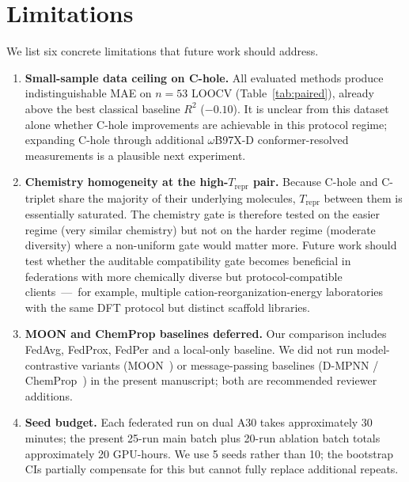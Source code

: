 \documentclass[11pt,a4paper]{article}
\begin{document}
\section{Limitations}\label{sec:limitations}

We list six concrete limitations that future work should address.

\begin{enumerate}
  \item \textbf{Small-sample data ceiling on C-hole.} All evaluated methods produce indistinguishable MAE on $n = 53$ LOOCV (Table~\ref{tab:paired}), already above the best classical baseline $R^2$ ($-0.10$). It is unclear from this dataset alone whether C-hole improvements are achievable in this protocol regime; expanding C-hole through additional $\omega$B97X-D conformer-resolved measurements is a plausible next experiment.

  \item \textbf{Chemistry homogeneity at the high-$T_{\mathrm{repr}}$ pair.} Because C-hole and C-triplet share the majority of their underlying molecules, $T_{\mathrm{repr}}$ between them is essentially saturated. The chemistry gate is therefore tested on the easier regime (very similar chemistry) but not on the harder regime (moderate diversity) where a non-uniform gate would matter more. Future work should test whether the auditable compatibility gate becomes beneficial in federations with more chemically diverse but protocol-compatible clients~---~for example, multiple cation-reorganization-energy laboratories with the same DFT protocol but distinct scaffold libraries.

  \item \textbf{MOON and ChemProp baselines deferred.} Our comparison includes FedAvg, FedProx, FedPer and a local-only baseline. We did not run model-contrastive variants (MOON~\citep{Li2021_MOON}) or message-passing baselines (D-MPNN / ChemProp~\citep{Yang2019_ChemProp}) in the present manuscript; both are recommended reviewer additions.

  \item \textbf{Seed budget.} Each federated run on dual A30 takes approximately 30 minutes; the present 25-run main batch plus 20-run ablation batch totals approximately 20 GPU-hours. We use 5 seeds rather than 10; the bootstrap CIs partially compensate for this but cannot fully replace additional repeats.


\end{enumerate}
\end{document}
